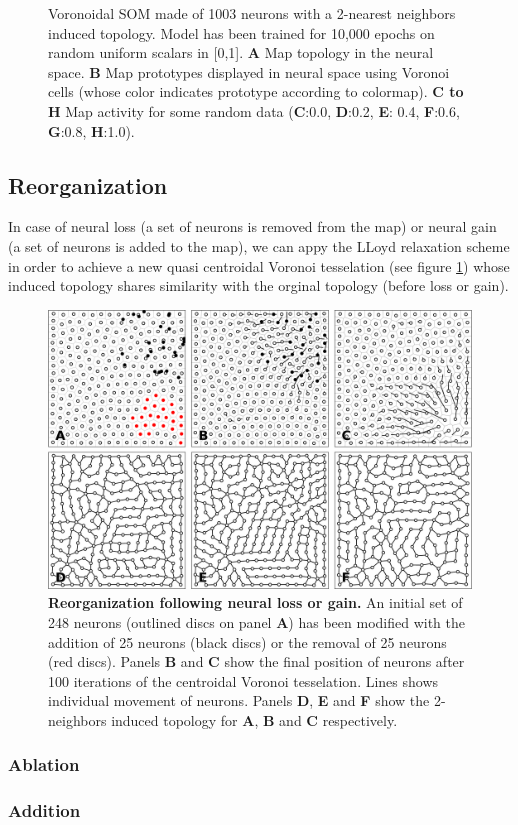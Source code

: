 \begin{figure}
  \caption{Voronoidal SOM made of 1003 neurons with a 2-nearest neighbors
    induced topology. Model has been trained for 10,000 epochs on random
    uniform scalars in [0,1]. \textbf{A} Map topology in the neural
    space. \textbf{B} Map prototypes displayed in neural space using Voronoi
    cells (whose color indicates prototype according to colormap). \textbf{C to
      H} Map activity for some random data (\textbf{C}:0.0, \textbf{D}:0.2,
    \textbf{E}: 0.4, \textbf{F}:0.6, \textbf{G}:0.8, \textbf{H}:1.0).}
\end{figure}


\subsection{Reorganization}

In case of neural loss (a set of neurons is removed from the map) or neural
gain (a set of neurons is added to the map), we can appy the LLoyd relaxation
scheme in order to achieve a new quasi centroidal Voronoi tesselation (see
figure \ref{fig:CVT}) whose induced topology shares similarity with the orginal
topology (before loss or gain).

\begin{figure}
  \includegraphics[width=\columnwidth]{figures/vsom-resilience.pdf}
  \caption{\textbf{Reorganization following neural loss or gain.}  An initial
    set of 248 neurons (outlined discs on panel \textbf{A}) has been modified
    with the addition of 25 neurons (black discs) or the removal of 25 neurons
    (red discs). Panels \textbf{B} and \textbf{C} show the final position of
    neurons after 100 iterations of the centroidal Voronoi tesselation. Lines
    shows individual movement of neurons. Panels \textbf{D}, \textbf{E} and
    \textbf{F} show the 2-neighbors induced topology for \textbf{A},
    \textbf{B} and \textbf{C} respectively.}
  \label{fig:CVT}
\end{figure}

\subsubsection*{Ablation}

\subsubsection*{Addition}
